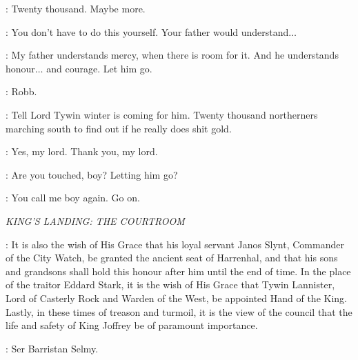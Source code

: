\SPY: Twenty thousand. Maybe more. 

\RODRIK: You don't have to do this yourself. Your father would understand$\ldots$  

\ROBB: My father understands mercy, when there is room for it. And he understands honour$\ldots$ and courage. Let him go. 

\CATELYN: Robb. 

\ROBB: Tell Lord Tywin winter is coming for him. Twenty thousand northerners marching south to find out if he really does shit gold. 

\SPY: Yes, my lord. Thank you, my lord. 


\UMBER: Are you touched, boy? Letting him go? 

\ROBB: You call me boy again. Go on. 



\scene

\textit{KING'S LANDING: THE COURTROOM}


\PYCELLE: It is also the wish of His Grace that his loyal servant Janos Slynt, Commander of the City Watch, be granted the ancient seat of Harrenhal, and that his sons and grandsons shall hold this honour after him until the end of time.  In the place of the traitor Eddard Stark, it is the wish of His Grace that Tywin Lannister, Lord of Casterly Rock and Warden of the West, be appointed Hand of the King. Lastly, in these times of treason and turmoil, it is the view of the council that the life and safety of King Joffrey be of paramount importance. 

\CERSEI:  Ser Barristan Selmy. 


